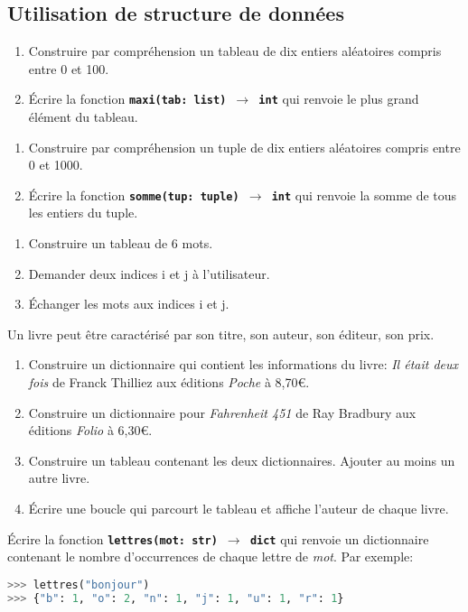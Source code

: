 \documentclass[a4paper,11pt]{article}
\begin{document}
\subsection{Utilisation de structure de données}
\begin{exo}
    \begin{enumerate}
        \item Construire par compréhension un tableau de dix entiers aléatoires compris entre 0 et 100.
        \item Écrire la fonction \textbf{\texttt{maxi(tab: list) $\rightarrow$ int}} qui renvoie le plus grand élément du tableau.
    \end{enumerate}
\end{exo}
\begin{exo}
    \begin{enumerate}
        \item Construire par compréhension un tuple de dix entiers aléatoires compris entre 0 et 1000.
        \item Écrire la fonction \textbf{\texttt{somme(tup: tuple) $\rightarrow$ int}} qui renvoie la somme de tous les entiers du tuple.
    \end{enumerate}
\end{exo}

\begin{exo}
    \begin{enumerate}
    \item Construire un tableau de 6 mots.
    \item Demander deux indices i et j à l'utilisateur.
    \item Échanger les mots aux indices i et j.
    \end{enumerate}
    \end{exo}
\begin{exo}Un livre peut être caractérisé par son titre, son auteur, son éditeur, son prix.
    \begin{enumerate}
        \item Construire un dictionnaire qui contient les informations du livre: \emph{Il était deux fois} de Franck Thilliez aux éditions \emph{Poche} à 8,70€.
        \item Construire un dictionnaire pour \emph{Fahrenheit 451} de Ray Bradbury aux éditions \emph{Folio} à 6,30€.
        \item Construire un tableau contenant les deux dictionnaires. Ajouter au moins un autre livre.
        \item Écrire une boucle qui parcourt le tableau et affiche l'auteur de chaque livre.
    \end{enumerate}
\end{exo}
\begin{exo}
    Écrire la fonction \texttt{\textbf{lettres(mot: str) $\rightarrow$ dict}} qui renvoie un dictionnaire contenant le nombre d'occurrences de chaque lettre de \emph{mot}. Par exemple:
        \begin{lstlisting}[language=Python]
>>> lettres("bonjour")
>>> {"b": 1, "o": 2, "n": 1, "j": 1, "u": 1, "r": 1}
\end{lstlisting}
\end{exo}
\end{document}
